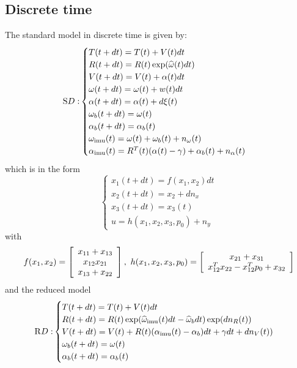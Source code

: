{\subsection{Discrete time}
%
The standard model in discrete time is given by:
\begin{equation}
{\mathrm SD:}
\begin{cases}
T(t+dt) = T(t) + V(t)dt \\
R(t+dt) = R(t)\exp(\widehat \w(t)dt) \\
V(t+dt) = V(t) + \alpha(t)dt \\
\w(t+dt) = \w(t) + w(t) dt \\
\alpha(t+dt) = \alpha(t) + d\xi(t)\\
\w_b(t+dt) = \w(t) \\
\alpha_b(t+dt) = \alpha_b(t) \\
\w\imu (t) = \w(t) + \w_b(t) + n_\w(t) \\
\alpha\imu (t) = R^T(t) (\alpha(t) - \gamma) + \alpha_b(t) + n_\alpha(t) 
\end{cases}
\end{equation}
which is in the form
\begin{equation}
\begin{cases}
x_1(t+dt) = f(x_1,x_2)dt \\
x_2(t+dt) = x_2 + dn_x \\
x_3(t+dt)= x_3(t) \\
u = h(x_1, x_2, x_3, p_0) + n_y
\end{cases}
\end{equation}
with 
\begin{equation}
f(x_1, x_2) = \ba{c}x_{11}+x_{13} \\ x_{12}x_{21} \\ x_{13}+x_{22} \ea, 
\ h(x_1, x_2, x_3, p_0) = \ba{c} x_{21} + x_{31} \\
x_{12}^T x_{22} - x_{12}^Tp_0 + x_{32} \ea
\end{equation}
and the reduced model
\begin{equation}
{\mathrm RD:}
\begin{cases}
T(t+dt) = T(t) + V(t)dt \\
R(t+dt) = R(t)\exp(\widehat \w\imu (t)dt - \widehat \w_b dt)\exp(dn_R(t)) \\
V(t+dt) = V(t) + R(t)(\alpha\imu (t) - \alpha_b)dt + \gamma dt + dn_V(t)) \\
\w_b(t+dt) = \w(t) \\
\alpha_b(t+dt) = \alpha_b(t)
\end{cases}
\end{equation}
}
